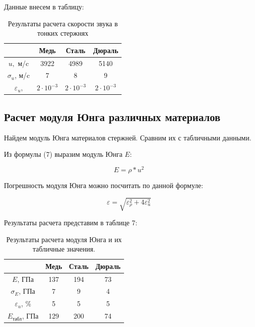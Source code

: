\documentclass[a4paper, 12pt]{article}
\begin{document}
    Данные внесем в таблицу:

    \begin{table}[h]
    \centering
        \begin{tabular}{|c|c|c|c|}
        \hline
        \multicolumn{1}{|l|}{} & Медь  & Сталь & Дюраль \\ \hline
        $u,$ м/c               & 3922  & 4989  & 5140   \\ \hline
        $\sigma_u$, м/c        & 7     & 8     & 9      \\ \hline
        $\varepsilon_u$,       & $2\cdot 10^{-3}$ & $2\cdot 10^{-3}$ & $2\cdot 10^{-3}$  \\ \hline
        \end{tabular}
        \caption{Результаты расчета скорости звука в тонких стержнях}
    \end{table}

    \subsection{Расчет модуля Юнга различных материалов}

    Найдем модуль Юнга материалов стержней. Сравним их с табличными данными.

    Из формулы (7) выразим модуль Юнга $E$:

    \begin{equation}
        E = \rho * u^2
    \end{equation}

    Погрешность модуля Юнга можно посчитать по данной формуле:

    \begin{equation}
        \varepsilon = \sqrt{\varepsilon_{\rho}^2 + 4\varepsilon_u^2}
    \end{equation}

    \newpage
    
    Результаты расчета представим в таблице 7:

    \begin{table}[h]
    \centering
        \begin{tabular}{|c|c|c|c|}
        \hline
        \multicolumn{1}{|l|}{} & Медь  & Сталь & Дюраль \\ \hline
        $E$, ГПа               & 137   & 194   & 73     \\ \hline
        $\sigma_E$, ГПа        & 7     & 9     & 4      \\ \hline
        $\varepsilon_u$, \%    & 5     & 5     & 5      \\ \hline \hline
        $E_{\text{табл}}$, ГПа & 129   & 200   & 74     \\ \hline
        \end{tabular}
        \caption{Результаты расчета модуля Юнга и их табличные значения.}
    \end{table}
\end{document}
